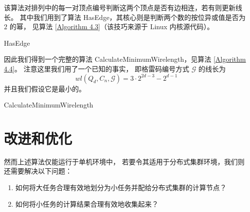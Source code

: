 该算法对排列中的每一对顶点编号判断这两个顶点是否有边相连，若有则更新线长。
其中我们用到了算法 HasEdge，其核心则是判断两个数的按位异或值是否为 $2$ 的幂，
见算法 \ref{Algorithm 4.3}（该技巧来源于 Linux 内核源代码）。

\begin{algorithm}
\caption{HasEdge}
\label{Algorithm 4.3}
\begin{algorithmic}[1]
	 
	 

		\State{\Return{\True{}};}
	\Else
		\State{\Return{\False{}};}
	\EndIf
\end{algorithmic}
\end{algorithm}

因此我们得到一个完整的算法 CalculateMinimumWirelength，见算法 \ref{Algorithm 4.4}。
注意这里我们用了一个已知的事实，
即格雷码编号方式 $\mathcal{G}$ 的线长为
\begin{equation*}
wl(Q_d, C_n, \mathcal{G}) = 3 \cdot 2^{2 d - 3} - 2^{d - 1}
\end{equation*}
并且我们假设它是最小的。

\begin{algorithm}
\caption{CalculateMinimumWirelength}
\label{Algorithm 4.4}
\begin{algorithmic}[1]
	 
	 
	 

	 
\end{algorithmic}
\end{algorithm}

\section{改进和优化}
\label{Section 4.3}

然而上述算法仅能运行于单机环境中，
若要令其适用于分布式集群环境，我们则还需要解决以下问题：
\begin{enumerate}[(1)]
	\item\label{Question 1} 如何将大任务合理有效地划分为小任务并配给分布式集群的计算节点？
	\item\label{Question 2} 如何将小任务的计算结果合理有效地收集起来？
\end{enumerate}

